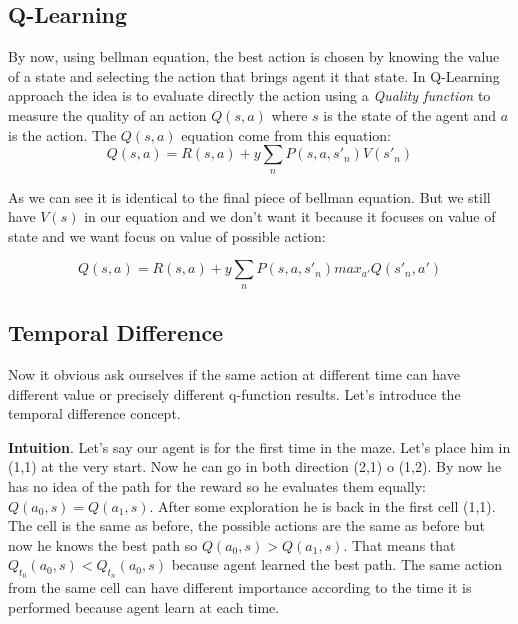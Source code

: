 \subsection{Q-Learning}
By now, using bellman equation, the best action is chosen by knowing the value of a state and selecting the action that brings agent it that state. In Q-Learning approach the idea is to evaluate directly the action using a \textit{Quality function} to measure the quality of an action $Q(s, a)$ where $s$ is the state of the agent  and $a$ is the action.
The $Q(s,a)$ equation come from this equation:
\begin{equation}
Q(s,a) = R(s,a) + y \sum_{n} P(s,a,s'_n)V(s'_n)
\end{equation}

As we can see it is identical to the final piece of bellman equation. But we still have $V(s)$ in our equation and we don't want it because it focuses on value of state and we want focus on value of possible action:

\begin{equation}
Q(s,a) = R(s,a) + y \sum_{n} P(s,a,s'_n) max_{a'}Q(s'_n, a')
\end{equation}

\subsection{Temporal Difference}

Now it obvious ask ourselves  if the same action at different time can have different value or precisely different q-function results. Let's introduce the temporal difference concept.

\textbf{Intuition}. Let's say our agent is for the first time in the maze. Let's place him in (1,1) at the very start. Now he can go in both direction (2,1) o (1,2). By now he has no idea of the path for the reward so he evaluates them equally: $Q(a_0, s) = Q(a_1,s)$. After some exploration he is back in the first cell (1,1). The cell is the same as before, the possible actions are the same as before but now he knows the best path so $Q(a_0, s) > Q(a_1,s)$. That means that $Q_{t_0}(a_0, s) < Q_{t_n}(a_0,s)$ because agent learned the best path. The same action from the same cell can have different importance according to the time it is performed because agent learn at each time.

